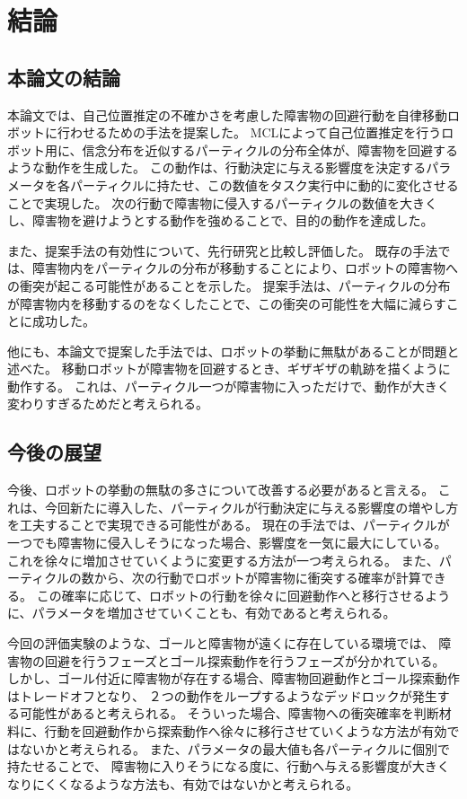 \chapter{結論} \label{chapter:conclusion}

\section{本論文の結論}
本論文では、自己位置推定の不確かさを考慮した障害物の回避行動を自律移動ロボットに行わせるための手法を提案した。
MCLによって自己位置推定を行うロボット用に、信念分布を近似するパーティクルの分布全体が、障害物を回避するような動作を生成した。
この動作は、行動決定に与える影響度を決定するパラメータを各パーティクルに持たせ、この数値をタスク実行中に動的に変化させることで実現した。
次の行動で障害物に侵入するパーティクルの数値を大きくし、障害物を避けようとする動作を強めることで、目的の動作を達成した。

また、提案手法の有効性について、先行研究と比較し評価した。
既存の手法では、障害物内をパーティクルの分布が移動することにより、ロボットの障害物への衝突が起こる可能性があることを示した。
提案手法は、パーティクルの分布が障害物内を移動するのをなくしたことで、この衝突の可能性を大幅に減らすことに成功した。

他にも、本論文で提案した手法では、ロボットの挙動に無駄があることが問題と述べた。
移動ロボットが障害物を回避するとき、ギザギザの軌跡を描くように動作する。
これは、パーティクル一つが障害物に入っただけで、動作が大きく変わりすぎるためだと考えられる。


\section{今後の展望}
今後、ロボットの挙動の無駄の多さについて改善する必要があると言える。
これは、今回新たに導入した、パーティクルが行動決定に与える影響度の増やし方を工夫することで実現できる可能性がある。
現在の手法では、パーティクルが一つでも障害物に侵入しそうになった場合、影響度を一気に最大にしている。
これを徐々に増加させていくように変更する方法が一つ考えられる。
また、パーティクルの数から、次の行動でロボットが障害物に衝突する確率が計算できる。
この確率に応じて、ロボットの行動を徐々に回避動作へと移行させるように、パラメータを増加させていくことも、有効であると考えられる。

今回の評価実験のような、ゴールと障害物が遠くに存在している環境では、
障害物の回避を行うフェーズとゴール探索動作を行うフェーズが分かれている。
しかし、ゴール付近に障害物が存在する場合、障害物回避動作とゴール探索動作はトレードオフとなり、
２つの動作をループするようなデッドロックが発生する可能性があると考えられる。
そういった場合、障害物への衝突確率を判断材料に、行動を回避動作から探索動作へ徐々に移行させていくような方法が有効ではないかと考えられる。
また、パラメータの最大値も各パーティクルに個別で持たせることで、
障害物に入りそうになる度に、行動へ与える影響度が大きくなりにくくなるような方法も、有効ではないかと考えられる。
